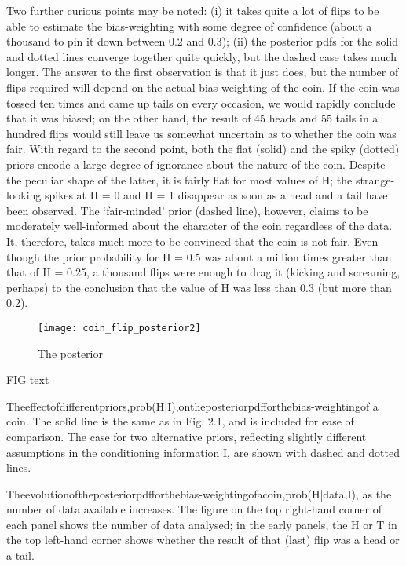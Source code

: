 Two further curious points may be noted: (i) it takes quite a lot of flips to be able to estimate the bias-weighting with some degree of confidence (about a thousand to pin it down between 0.2 and 0.3); (ii) the posterior pdfs for the solid and dotted lines converge together quite quickly, but the dashed case takes much longer. The answer to the first observation is that it just does, but the number of flips required will depend on the actual bias-weighting of the coin. If the coin was tossed ten times and came up tails on every occasion, we would rapidly conclude that it was biased; on the other hand, the result of 45 heads and 55 tails in a hundred flips would still leave us somewhat uncertain as to whether the coin was fair. With regard to the second point, both the flat (solid) and the spiky (dotted) priors encode a large degree of ignorance about the nature of the coin. Despite the peculiar shape of the latter, it is fairly flat for most values of H; the strange-looking spikes at H = 0 and H = 1 disappear as soon as a head and a tail have been observed. The ‘fair-minded’ prior (dashed line), however, claims to be moderately well-informed about the character of the coin regardless of the data. It, therefore, takes much more to be convinced that the coin is not fair. Even though the prior probability for H = 0.5 was about a million times greater than that of H = 0.25, a thousand flips were enough to drag it (kicking and screaming, perhaps) to the conclusion that the value of H was less than 0.3 (but more than 0.2).

\begin{figure}[ht]
    \centering
    \texttt{[image: coin\_flip\_posterior2]}
    \caption{The posterior
    }
    \label{fig:coin_flip_posterior2}
\end{figure} 

FIG text 

Theeffectofdifferentpriors,prob(H|I),ontheposteriorpdfforthebias-weightingof a coin. The solid line is the same as in Fig. 2.1, and is included for ease of comparison. The case for two alternative priors, reflecting slightly different assumptions in the conditioning information I, are shown with dashed and dotted lines.

Theevolutionoftheposteriorpdfforthebias-weightingofacoin,prob(H|{data},I), as the number of data available increases. The figure on the top right-hand corner of each panel shows the number of data analysed; in the early panels, the H or T in the top left-hand corner shows whether the result of that (last) flip was a head or a tail.

